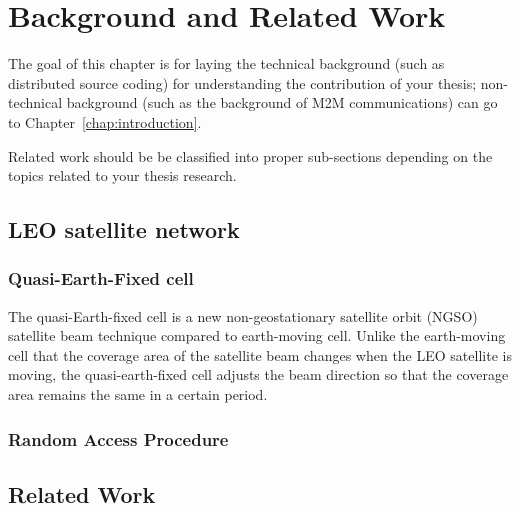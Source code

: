 \chapter{Background and Related Work}
\label{chap:background}

The goal of this chapter is for laying the technical background (such as distributed source coding) for understanding the contribution of your thesis; non-technical background (such as the background of M2M communications) can go to Chapter~\ref{chap:introduction}.

Related work should be be classified into proper sub-sections depending on the topics
related to your thesis research.
\section{LEO satellite network}

\subsection{Quasi-Earth-Fixed cell}

The quasi-Earth-fixed cell is a new non-geostationary satellite orbit (NGSO) satellite beam technique compared to earth-moving cell. Unlike the earth-moving cell that the coverage area of the satellite beam changes when the LEO satellite is moving, the quasi-earth-fixed cell adjusts the beam direction so that the coverage area remains the same in a certain period. 

\subsection{Random Access Procedure}


\section{Related Work}

